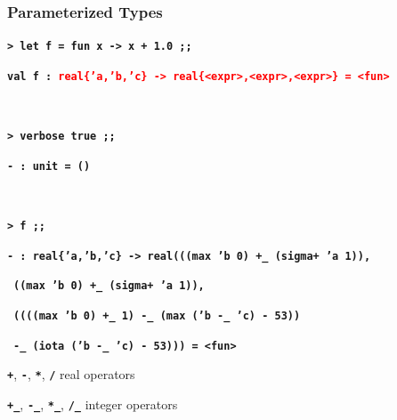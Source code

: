 \documentclass[handout,t]{beamer}
\def\mytt#1{\texttt{\textbf{#1}}}
\def\real#1{real\{#1\}}
\begin{document}
\begin{frame}
\frametitle{Parameterized Types}

\scriptsize
\color{blue}

\vspace{1cm}

\mytt{> let f = fun x -> x + 1.0 ;;}

\mytt{val f : \textcolor{red}{\real{'a,'b,'c} -> \real{<expr>,<expr>,<expr>} = <fun>}}

\mytt{\ }

\mytt{> verbose true ;;}

\mytt{- : unit = ()}

\mytt{\ }

\mytt{> f ;;}


\mytt{- : \real{'a,'b,'c} -> real(((max 'b 0) +\_ (sigma+ 'a 1)),}

~\hspace{3.5cm}\mytt{((max 'b 0) +\_ (sigma+ 'a 1)),}

~\hspace{3.5cm}\mytt{((((max 'b 0) +\_ 1) -\_ (max ('b -\_ 'c) - 53))}

~\hspace{3.5cm}\mytt{-\_ (iota ('b -\_ 'c) - 53))) = <fun>}

\vspace{0.6cm}

\normalsize\color{black}
\mytt{+}, \mytt{-}, \mytt{*}, \mytt{/} real operators 

\vspace{0.2cm}

\mytt{+\_}, \mytt{-\_}, \mytt{*\_}, \mytt{/\_} integer operators


\end{frame}
\end{document}
